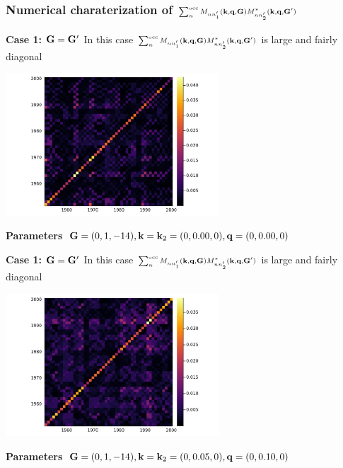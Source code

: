 \documentclass[t,aspectratio=169]{beamer}
\begin{document}
\begin{frame}[allowframebreaks]
\frametitle{Numerical charaterization of 
$\scriptstyle \sum_{n}^{\text{occ}} M_{n n'_1} (\vb{k}, \vb{q}, \vb{G}) M^*_{nn'_2} (\vb{k}, \vb{q}, \vb{G}') $}

\textbf{Case 1: $\vb{G} = \vb{G}'$}  In this case $\scriptstyle \sum_{n}^{\text{occ}} M_{n n'_1} (\vb{k}, \vb{q}, \vb{G}) M^*_{nn'_2} (\vb{k}, \vb{q}, \vb{G}')$ is large and fairly diagonal

\begin{center}
    \includegraphics[width=0.6\textwidth]{../data/chi/nc_range-1951-2000-k_idx-1-q_idx-1-G_idx-810.png}
\end{center}

\textbf{Parameters} $\vb{G} = (0, 1, -14), \vb{k} = \vb{k}_2 = (0, 0.00, 0), \vb{q} = (0, 0.00, 0)$

\framebreak

\textbf{Case 1: $\vb{G} = \vb{G}'$}  In this case $\scriptstyle \sum_{n}^{\text{occ}} M_{n n'_1} (\vb{k}, \vb{q}, \vb{G}) M^*_{nn'_2} (\vb{k}, \vb{q}, \vb{G}')$ is large and fairly diagonal

\begin{center}
    \includegraphics[width=0.6\textwidth]{../data/chi/nc_range-1951-2000-k_idx-2-q_idx-3-G_idx-810.png}
\end{center}

\textbf{Parameters} $\vb{G} = (0, 1, -14), \vb{k} = \vb{k}_2 = (0, 0.05, 0), \vb{q} = (0, 0.10, 0)$


\end{frame}
\end{document}
